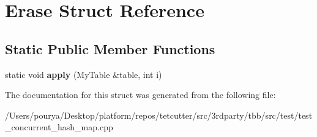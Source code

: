 \hypertarget{structErase}{}\section{Erase Struct Reference}
\label{structErase}
\subsection*{Static Public Member Functions}
\begin{DoxyCompactItemize}
\item 
\hypertarget{structErase_acd0975a4a97942ee9b3bb8caed583c35}{}static void {\bfseries apply} (My\+Table \&table, int i)\label{structErase_acd0975a4a97942ee9b3bb8caed583c35}

\end{DoxyCompactItemize}


The documentation for this struct was generated from the following file\+:\begin{DoxyCompactItemize}
\item 
/\+Users/pourya/\+Desktop/platform/repos/tetcutter/src/3rdparty/tbb/src/test/test\+\_\+concurrent\+\_\+hash\+\_\+map.\+cpp\end{DoxyCompactItemize}
